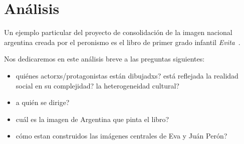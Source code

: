 \section{Análisis}

Un ejemplo particular del proyecto de consolidación de la imagen nacional argentina creada por el peronismo es el libro de primer grado infantil \textit{Evita}~\autocite{Albornoz1952}.

Nos dedicaremos en este análisis breve a las preguntas siguientes:
\begin{itemize}
  \item quiénes actorxs/protagonistas están dibujadxs? está reflejada la realidad social en su complejidad? la heterogeneidad cultural?
  \item a quién se dirige?
  \item cuál es la imagen de Argentina que pinta el libro?
  \item cómo estan construidos las imágenes centrales de Eva y Juán Perón?
\end{itemize}

